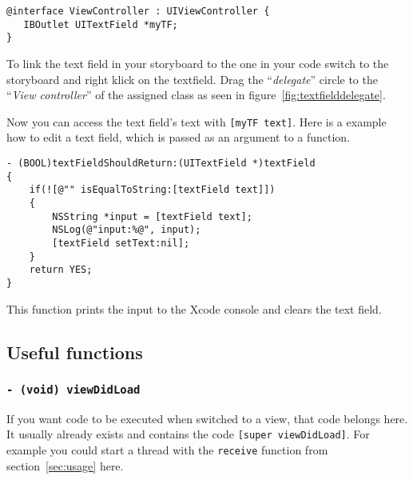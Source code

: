 \begin{lstlisting}
@interface ViewController : UIViewController {
   IBOutlet UITextField *myTF;
}
\end{lstlisting}

To link the text field in your storyboard to the one in your code switch to the storyboard and right klick on the textfield. Drag the ``\textit{delegate}'' circle to the ``\textit{View controller}'' of the assigned class as seen in figure~\ref{fig:textfielddelegate}.

Now you can access the text field's text with \lstinline^[myTF text]^. Here is a example how to edit a text field, which is passed as an argument to a function.

\begin{lstlisting}
- (BOOL)textFieldShouldReturn:(UITextField *)textField
{
    if(![@"" isEqualToString:[textField text]])
    {
        NSString *input = [textField text];
        NSLog(@"input:%@", input);
        [textField setText:nil];
    }
    return YES;
}
\end{lstlisting}

This function prints the input to the Xcode console and clears the text field.







\subsection{Useful functions}
\label{subsec:functions}

\subsubsection{\lstinline^- (void) viewDidLoad^}
\label{subsubsec:viewDidLoad}
If you want code to be executed when switched to a view, that code belongs here. It usually already exists and contains the code \lstinline^[super viewDidLoad]^. For example you could start a thread with the \lstinline^receive^ function from section~\ref{sec:usage} here.

